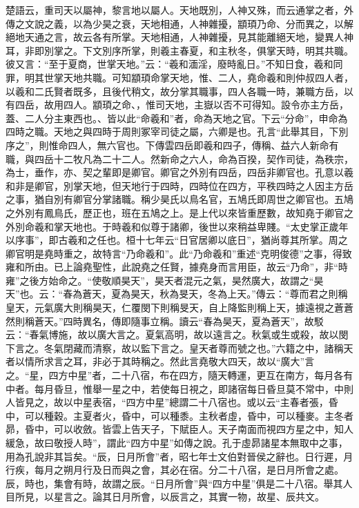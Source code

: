 {楚語}云，重司天以屬神，黎言地以屬人。天地既別，人神又殊，而云通掌之者，外傳之文說之義，以為少昊之衰，天地相通，人神雜擾，顓頊乃命、分而異之，以解絕地天通之言，故云各有所掌。天地相通，人神雜擾，見其能離絕天地，變異人神耳，非即別掌之。下文別序所掌，則羲主春夏，和主秋冬，俱掌天時，明其共職。彼又言：“至于夏商，世掌天地。”云：“羲和湎淫，廢時亂日。”不知日食，羲和同罪，明其世掌天地共職。可知顓頊命掌天地，惟、二人，堯命羲和則仲叔四人者，以羲和二氏賢者既多，且後代稍文，故分掌其職事，四人各職一時，兼職方岳，以有四岳，故用四人。顓頊之命、，惟司天地，主嶽以否不可得知。設令亦主方岳，蓋、二人分主東西也。、皆以此“命羲和”者，命為天地之官。下云“分命”，申命為四時之職。天地之與四時于周則冢宰司徒之屬，六卿是也。孔言“此舉其目，下別序之”，則惟命四人，無六官也。下傳雲四岳即羲和四子，傳稱、益六人新命有職，與四岳十二牧凡為二十二人。然新命之六人，命為百揆，契作司徒，為秩宗，為士，垂作，亦、契之輩即是卿官。卿官之外別有四岳，四岳非卿官也。孔意以羲和非是卿官，別掌天地，但天地行于四時，四時位在四方，平秩四時之人因主方岳之事，猶自別有卿官分掌諸職。稱少昊氏以鳥名官，五鳩氏即周世之卿官也。五鳩之外別有鳳鳥氏，歷正也，班在五鳩之上。是上代以來皆重歷數，故知堯于卿官之外別命羲和掌天地也。于時羲和似尊于諸卿，後世以來稍益卑賤。“太史掌正歲年以序事”，即古羲和之任也。桓十七年云“日官居卿以底日”，猶尚尊其所掌。周之卿官明是堯時重之，故特言“乃命羲和”。此“乃命羲和”重述“克明俊德”之事，得致雍和所由。已上論堯聖性，此說堯之任賢，據堯身而言用臣，故云“乃命”，非“時雍”之後方始命之。“使敬順昊天”，昊天者混元之氣，昊然廣大，故謂之“昊天”也。云：“春為蒼天，夏為昊天，秋為旻天，冬為上天。”傳云：“尊而君之則稱皇天，元氣廣大則稱昊天，仁覆閔下則稱旻天，自上降監則稱上天，據遠視之蒼蒼然則稱蒼天。”四時異名，傳即隨事立稱。讀云“春為昊天，夏為蒼天”，故駁云：“春氣博施，故以廣大言之。夏氣高明，故以遠言之。秋氣或生或殺，故以閔下言之。冬氣閉藏而清察，故以監下言之。皇天者尊而號之也。”六籍之中，諸稱天者以情所求言之耳，非必于其時稱之。然此言堯敬大四天，故以“廣大”言之。“星，四方中星”者，二十八宿，布在四方，隨天轉運，更互在南方，每月各有中者。每月昏旦，惟舉一星之中，若使每日視之，即諸宿每日昏旦莫不常中，中則人皆見之，故以中星表宿，“四方中星”總謂二十八宿也。或以云“主春者張，昏中，可以種穀。主夏者火，昏中，可以種黍。主秋者虛，昏中，可以種麥。主冬者昴，昏中，可以收斂。皆雲上告天子，下賦臣人。天子南面而視四方星之中，知人緩急，故曰敬授人時”，謂此“四方中星”如傳之說。孔于虛昴諸星本無取中之事，用為孔說非其旨矣。“辰，日月所會”者，昭七年士文伯對晉侯之辭也。日行遲，月行疾，每月之朔月行及日而與之會，其必在宿。分二十八宿，是日月所會之處。辰，時也，集會有時，故謂之辰。“日月所會”與“四方中星”俱是二十八宿。舉其人目所見，以星言之。論其日月所會，以辰言之，其實一物，故星、辰共文。\CJKunderw